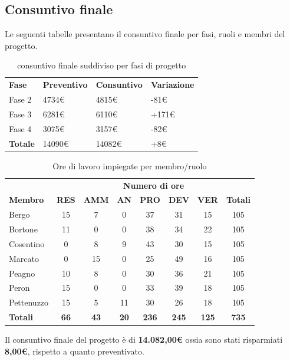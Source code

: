 	
\newpage
\subsection{Consuntivo finale}
Le seguenti tabelle presentano il consuntivo finale per fasi, ruoli e membri del progetto.

\begin{table}[H]
			\centering
		\begin{tabular}{| l | l | l | l |}
			\rowcolor{LightBlue}
			\textbf{\color{white}Fase}
			& \textbf{\color{white}Preventivo}
			& \textbf{\color{white}Consuntivo}
			& \textbf{\color{white}Variazione}
			\\
			
			Fase 2 			& 4734€ 	& 4815€ & -81€\\
			Fase 3 		& 6281€ 	& 6110€ & +171€\\
			Fase 4			& 3075€ 	& 3157€ & -82€ \\
			\textbf{Totale} & 14090€ & 14082€ & +8€\\ \hline
		\end{tabular}
		\caption{consuntivo finale suddiviso per fasi di progetto}	
\end{table}

\begin{table}[H]
			\centering
			
			\begin{tabular}{| l | c c c c c c | c |}
			\rowcolor{LightBlue}
			& \multicolumn{7}{c}{\textbf{\color{white}Numero di ore}}	\\
			
			\rowcolor{LightBlue}
			\textbf{\color{white}Membro}
			& \textbf{\color{white}RES}
			& \textbf{\color{white}AMM}
			& \textbf{\color{white}AN}
			& \textbf{\color{white}PRO}
			& \textbf{\color{white}DEV}
			& \textbf{\color{white}VER}
			& \textbf{\color{white}Totali}\\
			Bergo & 15 & 7 & 0 & 37 & 31 & 15 & 105\\
			Bortone & 11 & 0 & 0 & 38 & 34 & 22 & 105\\
			Cosentino & 0 & 8 & 9 & 43 & 30 & 15 & 105\\
			Marcato  & 0 & 15 & 0 & 25 & 49 & 16 & 105\\
			Peagno & 10 & 8 & 0 & 30 & 36 & 21 & 105\\
			Peron   & 15 & 0 & 0 & 33 & 39 & 18 & 105\\
			Pettenuzzo & 15 & 5 & 11 & 30 & 26 & 18 & 105\\ 
			\hline
			\rowcolor{LightBlue}
			\textbf{\color{white}Totali} & \textbf{\color{white}66} & \textbf{\color{white}43} & \textbf{\color{white}20} & \textbf{\color{white}236} & \textbf{\color{white}245} & \textbf{\color{white}125} & \textbf{\color{white}735} \\ \hline
			
		\end{tabular}
		\caption{Ore di lavoro impiegate per membro/ruolo}
	\end{table}
	
	Il consuntivo finale del progetto è di \textbf{14.082,00€} ossia sono stati risparmiati \textbf{8,00€}, rispetto a quanto preventivato.


